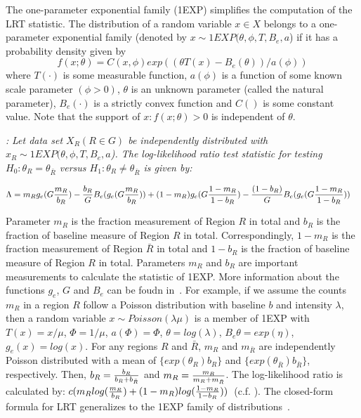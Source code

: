 \documentclass[AMA,LATO1COL]{WileyNJD-v2}
\begin{document}
The one-parameter exponential family (1EXP) simplifies the computation of the LRT statistic. The distribution of a random variable $x\in X$ belongs to a one-parameter exponential family \cite{DagMaxmize} (denoted by $x\sim 1EXP(\theta,\phi,T,B_e,a$) if it has a probability density given by
\begin{equation}
f(x; \theta )=C(x,\phi)exp((\theta T(x)-B_e(\theta))/a(\phi))
\label{oneexp}
\end{equation}
where  $T(\cdot)$ is some measurable function, $a(\phi)$ is a function of some known scale parameter $(\phi>0)$, $\theta$ is an unknown parameter (called the natural parameter), $B_e(\cdot)$ is a strictly convex function and $C()$ is some constant value. Note that the support of ${x:f(x;\theta)>0}$ is independent of $\theta$.
\begin{theorem}\label{thm1}
{\it\cite{DagMaxmize}:}
{\it Let data set $X_R (R\in G)$ be independently distributed with $x_R\sim 1EXP(\theta,\phi,T,B_e,a$). The log-likelihood ratio test statistic for testing $H_{0}: \theta_R = \theta_{\bar R}$ versus $H_{1}: \theta_R \neq \theta_{\bar R}$ is given by:}

\begin{eqnarray}
\Lambda&={m_R}g_e({G{m_R\over b_R}})-{b_R\over G} {B_e(g_e(G{m_R\over b_R}))} +(1-m_R)g_e({G{1-m_R\over {1-b_R}}})-{(1-b_R)\over G}{B_e(g_e({G{1-m_R\over {1-b_R}}}))}
\label{eq}
\end{eqnarray}
\label{thm1}
\end{theorem}
Parameter $m_R$ is the fraction measurement of Region $R$ in total and $b_R$ is the fraction of baseline measure of Region $R$ in total. Correspondingly, $1-m_R$ is the fraction measurement of Region $\bar R$ in total and $1-b_R$ is the fraction of baseline measure of Region $R$ in total. Parameters $m_R$  and $b_R$ are important measurements to calculate the statistic of 1EXP. More information about the functions $g_e$, $G$ and $B_e$ can be foudn in~\cite{DagMaxmize}.
For example, if we assume the counts $m_R$ in a region $R$ follow a Poisson distribution with baseline $b$ and intensity $\lambda$, then a random variable $x \sim Poisson(\lambda \mu)$ is a member of 1EXP with $T(x)=x/\mu$, $\Phi=1/\mu$, $a(\Phi)=\Phi$, $\theta=log(\lambda)$, $B_e{\theta}=exp(\eta)$, $g_e{(x)}=log(x)$. For any regions $R$ and $\bar R$, $m_R$ and $m_{\bar R}$ are independently Poisson distributed with a mean of $\{exp(\theta_R)b_R\}$ and $\{exp(\theta_{\bar R})b_{\bar R}\}$, respectively. Then, $b_R={b_R\over {b_R+b_{\bar R}}}$ and $m_R={m_R\over {m_R+m_{\bar R}}}$. The log-likelihood ratio is calculated by: $c(m_R log ({m_R\over {b_R}})+ (1-m_R)log({{1-m_R}\over {1-b_R} }))$~(c.f. \cite{DagMaxmize}). The closed-form formula for LRT generalizes to the 1EXP family of distributions~\cite{DagMaxmize}.
\end{document}
